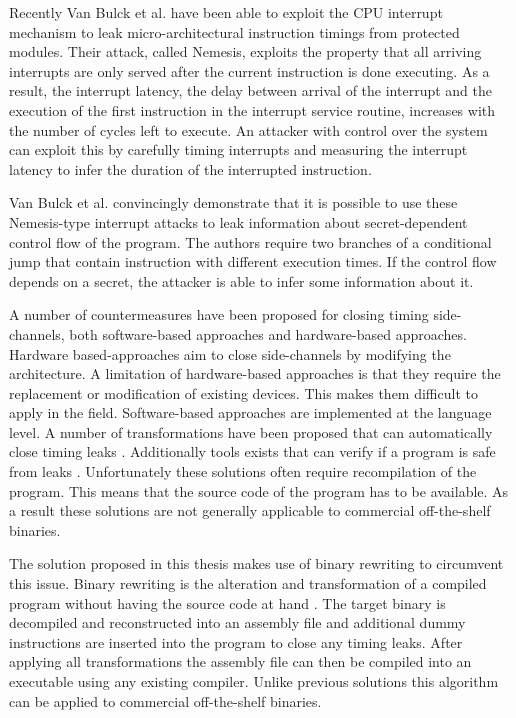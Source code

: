 Recently Van Bulck et al. \cite{Nemesis} have been able to exploit the CPU interrupt mechanism to leak micro-architectural instruction timings from protected modules. 
Their attack, called Nemesis, exploits the property that all arriving interrupts are only served after the current instruction is done executing. 
As a result, the interrupt latency, the delay between arrival of the interrupt and the execution of the first instruction in the interrupt service routine, increases with the number of cycles left to execute.
An attacker with control over the system can exploit this by carefully timing interrupts and measuring the interrupt latency to infer the duration of the interrupted instruction. 

Van Bulck et al. \cite{Nemesis} convincingly demonstrate that it is possible to use these Nemesis-type interrupt attacks to leak information about secret-dependent control flow of the program. 
The authors require two branches of a conditional jump that contain instruction with different execution times. 
If the control flow depends on a secret, the attacker is able to infer some information about it. 


A number of countermeasures have been proposed for closing timing side-channels, both software-based approaches and hardware-based approaches. 
Hardware based-approaches aim to close side-channels by modifying the architecture. 
A limitation of hardware-based approaches is that they require the replacement or modification of existing devices. This makes them difficult
to apply in the field. 
Software-based approaches are implemented at the language level. A number of transformations have been proposed that can automatically close timing leaks \cite{programcounter}. 
Additionally tools exists that can verify if a program is safe from leaks \cite{verify-constant-time, Barthe}. Unfortunately these solutions often require recompilation of the program. This means
that the source code of the program has to be available. As a result these solutions are not generally applicable to commercial off-the-shelf binaries. 

The solution proposed in this thesis makes use of binary rewriting to circumvent this issue. Binary rewriting is the alteration and transformation of a compiled program without having the source code at hand \cite{rewriting-survey}. 
The target binary is decompiled and reconstructed into an assembly file and additional dummy instructions are inserted into the program to close any timing leaks. 
After applying all transformations the assembly file can then be compiled into an executable using any existing compiler. 
Unlike previous solutions this algorithm can be applied to commercial off-the-shelf binaries. 

